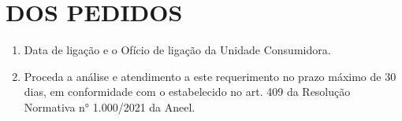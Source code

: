 \section{DOS PEDIDOS}

\newcommand{\tipoRequerimento}{Solicitação de Cópia do Ofício de Ligação}

\begin{enumerate}[resume]
  \item Data de ligação e o Ofício de ligação da Unidade Consumidora.
  \item Proceda a análise e atendimento a este requerimento no prazo máximo de 30 dias, em conformidade com o estabelecido no art. 409 da Resolução Normativa n° 1.000/2021 da Aneel.
\end{enumerate}
